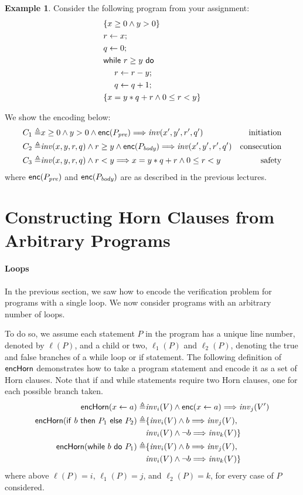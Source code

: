 \documentclass{amsart}
\theoremstyle{definition}
\newtheorem{example}[theorem]{Example}
\theoremstyle{remark}
\numberwithin{equation}{section}
\begin{document}
\begin{example}
Consider the following program from your assignment:
\begin{align*}
&\{x \geq 0 \land y > 0\}\\
& r \gets x;\\
& q \gets 0;\\
& \mathsf{while} \ r \geq y \ \mathsf{do}\\
& \ \ \ \ r \gets r - y;\\
& \ \ \ \ q \gets q + 1;\\
&\{x = y * q + r \land 0 \leq r < y\}
\end{align*}

We show the encoding below:
\begin{align*}
  C_1 \triangleq&
  x \geq 0 \land y > 0 \land \enc(P_\pre) \Longrightarrow \inv(x',y',r',q') & \text{initiation}\\
  C_2 \triangleq&
  \inv(x,y,r,q) \land r\geq y \land
    \enc(P_\body) \Longrightarrow \inv(x',y',r',q') & \text{consecution}\\
%
  C_3 \triangleq&
    \inv(x,y,r,q) \land  r < y \Longrightarrow x = y * q + r \land 0 \leq r < y
 & \text{safety}
\end{align*}
where $\mathsf{enc}(P_{\emph{pre}})$ and $\mathsf{enc}(P_{\emph{body}})$ are as described in the previous
lectures.
\end{example}

\section{Constructing Horn Clauses from Arbitrary Programs}
\paragraph{Loops}
In the previous section, we saw how to encode the verification
problem for programs with a single loop. We now consider programs
with an arbitrary number of loops.

To do so, we assume each statement $P$ in the program has a unique
line number, denoted by $\ell(P)$, and a child or two, $\ell_1(P)$
and $\ell_2(P)$, denoting the true and false branches of a while loop
or if statement.
The following definition of $\mathsf{encHorn}$ demonstrates
how to take a program statement and encode it as a set of Horn clauses.
Note that if and while statements require two Horn clauses,
one for each possible branch taken.
%
\begin{align*}
  \mathsf{encHorn}(x \gets a) \triangleq&  \mathit{inv}_i(V) \land \mathsf{enc}(x \gets a) \Longrightarrow \mathit{inv}_j(V')\\
  \mathsf{encHorn}(\mathsf{if} \ b \ \mathsf{then} \ P_1 \ \mathsf{else} \ P_2) \triangleq&
    \{\mathit{inv}_i(V) \land b \Longrightarrow \mathit{inv}_j(V), \\
    & \mathit{inv}_i(V) \land \neg b \Longrightarrow \mathit{inv}_k(V)\}\\
    \mathsf{encHorn}(\mathsf{while} \ b \ \mathsf{do} \ P_1) \triangleq&
      \{\mathit{inv}_i(V) \land b \Longrightarrow \mathit{inv}_j(V), \\
      & \mathit{inv}_i(V) \land \neg b \Longrightarrow \mathit{inv}_k(V)\}
\end{align*}
where above $\ell(P) = i$, $\ell_1(P) = j$, and $\ell_2(P) = k$,
for every case of $P$ considered.
\end{document}
